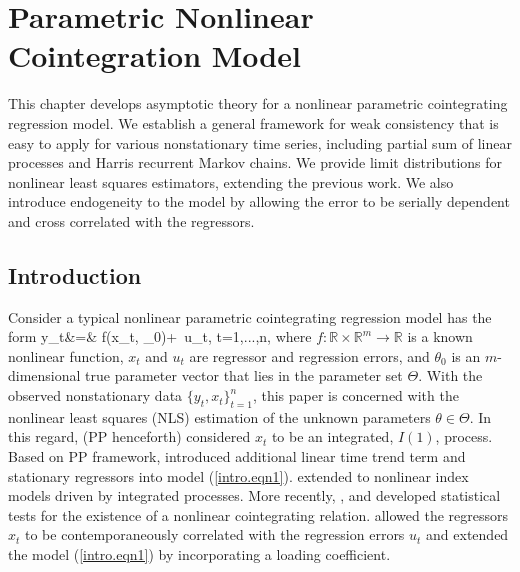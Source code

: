
\chapter{Parametric Nonlinear Cointegration Model}
\ifpdf
    \graphicspath{{Chapter6/Chapter6Figs/PNG/}{Chapter6/Chapter6Figs/PDF/}{Chapter6/Chapter6Figs/}}
\else
    \graphicspath{{Chapter6/Chapter6Figs/EPS/}{Chapter6/Chapter6Figs/}}
\fi

 This chapter develops  asymptotic theory for a nonlinear parametric cointegrating regression model. We establish a general framework for  weak consistency that is easy to apply for various nonstationary time series, including partial sum of linear processes and  Harris recurrent Markov chains. We provide  limit distributions for  nonlinear least squares  estimators,    extending the previous work.  We also introduce endogeneity to the model by allowing the error to be serially dependent and cross correlated with the regressors.



\section{Introduction} 
Consider a typical nonlinear parametric cointegrating regression model has the form
 \be y_t&=&
f(x_t, \theta_0)+\,  u_t, \quad t=1,...,n,
\ee
where  $f:\mathbb{R} \times \mathbb{R}^m \rightarrow \mathbb{R}$ is a known nonlinear function,
$x_t$ and  $u_t$ are regressor and regression errors, and   $\theta_0$ is an $m$-dimensional true parameter vector that lies in the parameter set $\Theta$. With the observed nonstationary data $\{y_t, x_t\}_{t=1}^n$, this paper is concerned with the nonlinear least squares (NLS) estimation of the unknown parameters $\theta\in \Theta$. In this regard, \cite{parkphillips2001} (PP henceforth) considered $x_t$ to be an integrated, $I(1)$, process. Based on PP framework, \cite{changparkphillips2001} introduced additional linear time trend term and stationary regressors into model (\ref{intro.eqn1}). \cite{changpark2003} extended to nonlinear index models driven by integrated processes.  More recently, \cite{choisaikkonen2010}, \cite{gaokinglutjostheim2009} and \cite{wangphillips2012} developed statistical tests  for the existence of a nonlinear cointegrating relation. \cite{changpark2010} allowed the regressors $x_t$ to be contemporaneously correlated with the regression errors $u_t$ and \cite{shiphillips2010} extended the model (\ref{intro.eqn1}) by incorporating a loading coefficient.


